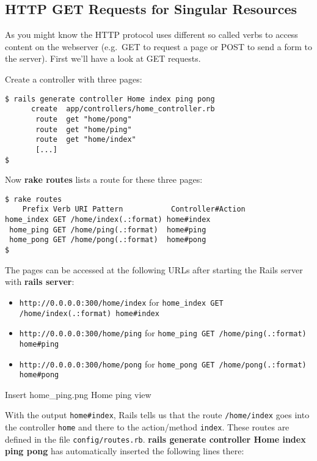 \documentclass[a4paper]{book}
\begin{document}
\subsection{HTTP GET Requests for Singular Resources}\label{http-get-requests-for-singular-resources}

As you might know the HTTP protocol uses different so called verbs to access content on the webserver (e.g.~GET to request a page or POST to send a form to the server). First we'll have a look at GET requests.

Create a controller with three pages:

\begin{shaded}\begin{verbatim}
$ rails generate controller Home index ping pong
      create  app/controllers/home_controller.rb
       route  get "home/pong"
       route  get "home/ping"
       route  get "home/index"
       [...]
$
\end{verbatim}\end{shaded}

Now \textbf{rake routes} lists a route for these three pages:

\begin{shaded}\begin{verbatim}
$ rake routes
    Prefix Verb URI Pattern           Controller#Action
home_index GET /home/index(.:format) home#index
 home_ping GET /home/ping(.:format)  home#ping
 home_pong GET /home/pong(.:format)  home#pong
$
\end{verbatim}\end{shaded}

The pages can be accessed at the following URLs after starting the Rails server with \textbf{rails server}:

\begin{itemize}
\itemsep1pt\parskip0pt
\item
  \texttt{http://0.0.0.0:300/home/index} for \texttt{home\_index GET /home/index(.:format)           home\#index}
\item
  \texttt{http://0.0.0.0:300/home/ping} for \texttt{home\_ping GET /home/ping(.:format)           home\#ping}
\item
  \texttt{http://0.0.0.0:300/home/pong} for \texttt{home\_pong GET /home/pong(.:format)           home\#pong}
\end{itemize}

Insert home\_ping.png Home ping view

With the output \texttt{home\#index}, Rails tells us that the route \texttt{/home/index} goes into the controller \texttt{home} and there to the action/method \texttt{index}. These routes are defined in the file \texttt{config/routes.rb}. \textbf{rails generate controller Home index ping pong} has automatically inserted the following lines there:
\end{document}

